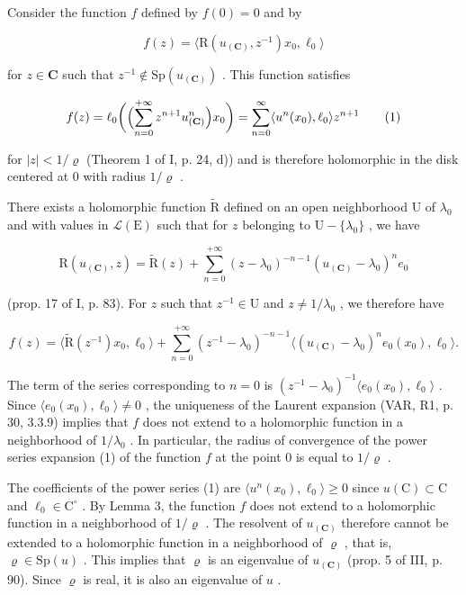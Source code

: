 Consider the function \(f\) defined by \(f(0)=0\) and by

\[
f (z) = \langle \mathrm{R} (u _ {(\mathbf {C})}, z ^ {- 1}) x _ {0}, \ell_ {0} \rangle
\]

for \(z \in \mathbf{C}\) such that \(z^{-1} \notin \mathrm{Sp}(u_{(\mathbf{C})})\) . This function satisfies

\[
f (z) = \ell_ {0} \bigg (\Bigl (\sum_ {n = 0} ^ {+ \infty} z ^ {n + 1} u _ {(\mathbf {C})} ^ {n} \Bigr) x _ {0} \bigg) = \sum_ {n = 0} ^ {\infty} \langle u ^ {n} (x _ {0}), \ell_ {0} \rangle z ^ {n + 1}\tag{1}
\]

for \(|z| < 1 / \varrho\) (Theorem 1 of I, p. 24, d)) and is therefore holomorphic in the disk centered at 0 with radius \(1 / \varrho\) .

There exists a holomorphic function \(\widetilde{\mathrm{R}}\) defined on an open neighborhood U of \(\lambda_0\) and with values in \(\mathcal{L}(\mathrm{E})\) such that for \(z\) belonging to \(\mathrm{U} - \{\lambda_0\}\) , we have

\[
\mathrm{R} (u _ {(\mathbf {C})}, z) = \widetilde {\mathrm{R}} (z) + \sum_ {n = 0} ^ {+ \infty} (z - \lambda_ {0}) ^ {- n - 1} (u _ {(\mathbf {C})} - \lambda_ {0}) ^ {n} e _ {0}
\]

(prop. 17 of I, p. 83). For \(z\) such that \(z^{-1} \in \mathrm{U}\) and \(z \neq 1 / \lambda_0\) , we therefore have

\[
f (z) = \langle \widetilde {\mathrm{R}} (z ^ {- 1}) x _ {0}, \ell_ {0} \rangle + \sum_ {n = 0} ^ {+ \infty} (z ^ {- 1} - \lambda_ {0}) ^ {- n - 1} \langle (u _ {(\mathbf {C})} - \lambda_ {0}) ^ {n} e _ {0} (x _ {0}), \ell_ {0} \rangle .
\]

The term of the series corresponding to \(n=0\) is \((z^{-1}-\lambda_{0})^{-1}\langle e_{0}(x_{0}),\ell_{0}\rangle\) . Since \(\langle e_{0}(x_{0}),\ell_{0}\rangle\neq0\) , the uniqueness of the Laurent expansion (VAR, R1, p. 30, 3.3.9) implies that \(f\) does not extend to a holomorphic function in a neighborhood of \(1/\lambda_{0}\) . In particular, the radius of convergence of the power series expansion (1) of the function \(f\) at the point 0 is equal to \(1/\varrho\) .

The coefficients of the power series (1) are \(\langle u^n(x_0),\ell_0\rangle\geqslant 0\) since \(u(\mathrm{C})\subset\mathrm{C}\) and \(\ell_{0}\in\mathrm{C}^{\circ}\) . By Lemma 3, the function \(f\) does not extend to a holomorphic function in a neighborhood of \(1/\varrho\) . The resolvent of \(u_{(\mathbf{C})}\) therefore cannot be extended to a holomorphic function in a neighborhood of \(\varrho\) , that is, \(\varrho\in\mathrm{Sp}(u)\) . This implies that \(\varrho\) is an eigenvalue of \(u_{(\mathbf{C})}\) (prop. 5 of III, p. 90). Since \(\varrho\) is real, it is also an eigenvalue of \(u\) .

